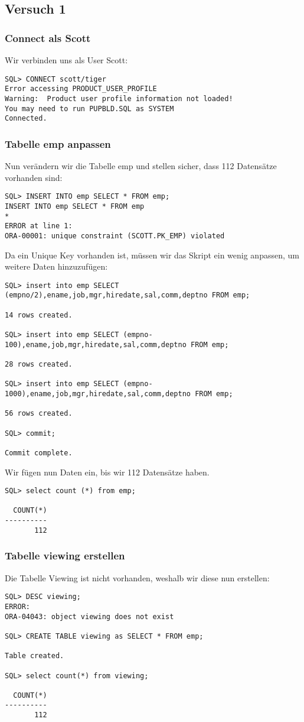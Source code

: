 \documentclass[11pt,a4paper,parskip=half]{scrartcl}
\begin{document}
\subsection{Versuch 1}
\subsubsection{Connect als Scott}
Wir verbinden uns als User Scott:
\begin{lstlisting}
SQL> CONNECT scott/tiger
Error accessing PRODUCT_USER_PROFILE
Warning:  Product user profile information not loaded!
You may need to run PUPBLD.SQL as SYSTEM
Connected.
\end{lstlisting}

\subsubsection{Tabelle emp anpassen}
Nun verändern wir die Tabelle emp und stellen sicher, dass 112 Datensätze vorhanden  sind:
\begin{lstlisting}
SQL> INSERT INTO emp SELECT * FROM emp;
INSERT INTO emp SELECT * FROM emp
*
ERROR at line 1:
ORA-00001: unique constraint (SCOTT.PK_EMP) violated
\end{lstlisting}

Da ein Unique Key vorhanden ist, müssen wir das Skript ein wenig anpassen, um weitere Daten hinzuzufügen:
\begin{lstlisting}
SQL> insert into emp SELECT (empno/2),ename,job,mgr,hiredate,sal,comm,deptno FROM emp;

14 rows created.

SQL> insert into emp SELECT (empno-100),ename,job,mgr,hiredate,sal,comm,deptno FROM emp;

28 rows created.

SQL> insert into emp SELECT (empno-1000),ename,job,mgr,hiredate,sal,comm,deptno FROM emp;

56 rows created.

SQL> commit;

Commit complete.
\end{lstlisting}

Wir fügen nun Daten ein, bis wir 112 Datensätze haben.
\begin{lstlisting}
SQL> select count (*) from emp;

  COUNT(*)
----------
       112
\end{lstlisting}

\subsubsection{Tabelle viewing erstellen}
Die Tabelle Viewing ist nicht vorhanden, weshalb wir diese nun erstellen:
\begin{lstlisting}
SQL> DESC viewing;
ERROR:
ORA-04043: object viewing does not exist

SQL> CREATE TABLE viewing as SELECT * FROM emp;

Table created.

SQL> select count(*) from viewing;

  COUNT(*)
----------
       112
\end{lstlisting}
\end{document}
